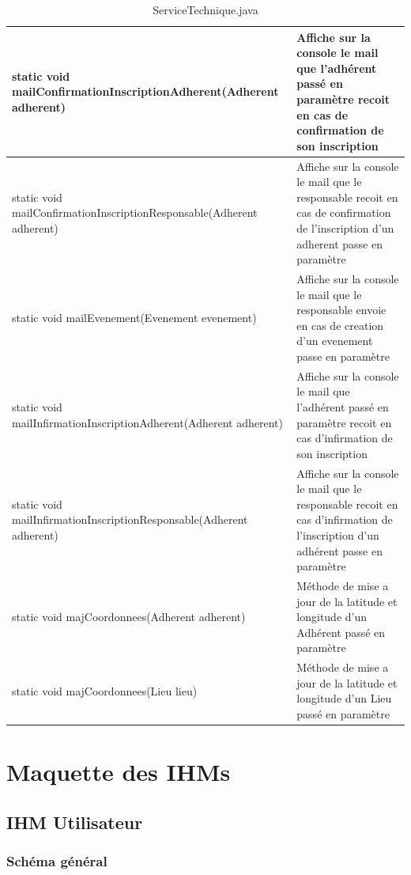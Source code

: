 \documentclass[a4paper,11pt]{article}
\begin{document}
\begin{table}[H]
  \caption{ServiceTechnique.java}
  \label{tab:ServiceTechnique}

  \begin{center}
    \begin{tabular}{|P{7cm}|p{7cm}|}
    \hline
       static void mailConfirmationInscriptionAdherent(Adherent adherent) & Affiche sur la console le mail que l'adhérent passé en paramètre recoit en cas de confirmation de son inscription \\ \hline
       static void mailConfirmationInscriptionResponsable(Adherent adherent) & Affiche sur la console le mail que le responsable recoit en cas de confirmation de l'inscription d'un adherent passe en paramètre \\ \hline
       static void mailEvenement(Evenement evenement) & Affiche sur la console le mail que le responsable envoie en cas de creation d'un evenement passe en paramètre \\ \hline
static void mailInfirmationInscriptionAdherent(Adherent adherent) & Affiche sur la console le mail que l'adhérent passé en paramètre recoit en cas d'infirmation de son inscription \\ \hline
static void mailInfirmationInscriptionResponsable(Adherent adherent) & Affiche sur la console le mail que le responsable recoit en cas d'infirmation de l'inscription d'un adhérent passe en paramètre \\ \hline
static void majCoordonnees(Adherent adherent) & Méthode de mise a jour de la latitude et longitude d'un Adhérent passé en paramètre \\ \hline
static void majCoordonnees(Lieu lieu) & Méthode de mise a jour de la latitude et longitude d'un Lieu passé en paramètre \\ \hline
    \end{tabular}
  \end{center}
\end{table}


\pagebreak
\section{Maquette des IHMs}

\subsection{IHM Utilisateur}

\subsubsection{Schéma général}
\end{document}

